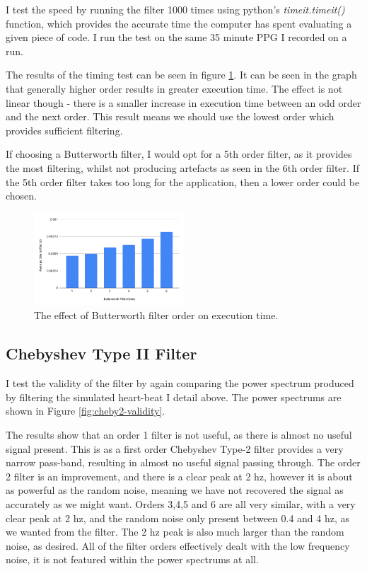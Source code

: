 \documentclass[12pt,a4paper,twoside,openright]{report}
\begin{document}
I test the speed by running the filter 1000 times using python's
\emph{timeit.timeit()} function, which provides the accurate time the computer
has spent evaluating a given piece of code. I run the test on the same 35
minute PPG I recorded on a run. 

The results of the timing test can be seen in figure \ref{fig:butter-time}. It
can be seen in the graph that generally higher order results in greater
execution time. The effect is not linear though - there is a smaller increase
in execution time 
between an odd order and the next order. This result means we should use the
lowest order which provides sufficient filtering.

If choosing a Butterworth filter, I would opt for a 5th order filter, as it
provides the most filtering, whilst not producing artefacts as seen in the 6th
order filter. If the 5th order filter takes too long for the application, then
a lower order could be chosen.

\begin{figure}[tbh]
	\centerline{\includegraphics[width=0.5\textwidth]{figs/butter-time.png}}
	\caption{The effect of Butterworth filter order on execution time.}
	\label{fig:butter-time}
\end{figure}

\subsection{Chebyshev Type II Filter}

I test the validity of the filter by again comparing the power spectrum produced by
filtering the simulated heart-beat I detail above. The power spectrums are
shown in Figure 
\ref{fig:cheby2-validity}. 

The results show that an order 1 filter is not useful, as there is almost no
useful signal present. This is as a first order Chebyshev Type-2 filter
provides a very narrow pass-band, resulting in almost no useful signal passing
through. The order 2 filter is an improvement, and there is a
clear peak at 2 hz, however it is about as powerful as the random noise,
meaning we have not recovered the signal as accurately as we might want. 
Orders 3,4,5 and 6 are all very
similar, with a very clear peak at 2 hz, and the random noise only present
between 0.4 and 4 hz, as we wanted from the filter. The 2 hz peak is also much
larger than the random noise, as desired. All of the filter orders effectively
dealt with the low frequency noise, it is not featured within the power
spectrums at all.
\end{document}
